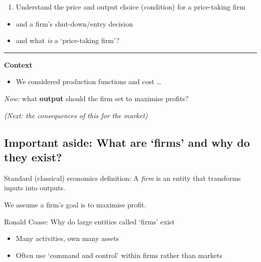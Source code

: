 \documentclass[]{article}
\providecommand{\tightlist}{%
  \setlength{\itemsep}{0pt}\setlength{\parskip}{0pt}}
\begin{document}
\begin{enumerate}
\def\labelenumi{\arabic{enumi}.}
\tightlist
\item
  Understand the price and output choice (condition) for a price-taking
  firm
\end{enumerate}

\begin{itemize}
\tightlist
\item
  and a firm's shut-down/entry decision
\item
  and what \emph{is} a `price-taking firm'?
\end{itemize}

\begin{center}\rule{0.5\linewidth}{\linethickness}\end{center}

\textbf{Context}

\begin{itemize}
\tightlist
\item
  We considered production functions and cost \ldots{}
\end{itemize}

\bigskip

\emph{Now:} what \textbf{output} should the firm set to maximise
profits?

\bigskip

\emph{(Next: the consequences of this for the market)}

\hypertarget{important-aside-what-are-firms-and-why-do-they-exist}{%
\subsection{Important aside: What are `firms' and why do they
exist?}\label{important-aside-what-are-firms-and-why-do-they-exist}}

Standard (classical) economics definition: A \emph{firm} is an entity
that transforms inputs into outputs.

\bigskip

We assume a firm's goal is to maximise profit.

Ronald Coase: Why do large entities called `firms' exist

\bigskip

\begin{itemize}
\tightlist
\item
  Many activities, own many assets
\item
  Often use `command and control' within firms rather than markets
\end{itemize}
\end{document}
